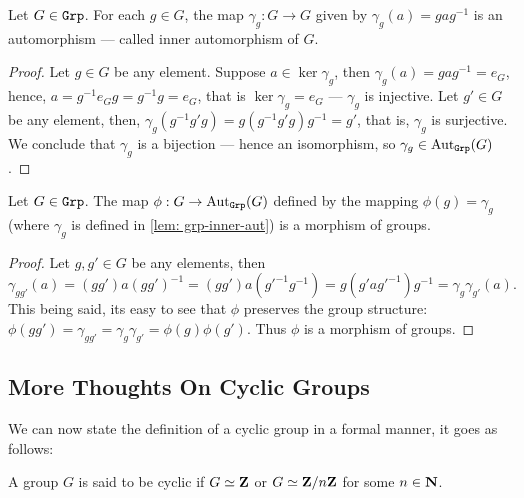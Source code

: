 \begin{lemma}\label{lem: grp-inner-aut}
    Let \(G \in {\texttt{Grp}}\). For each \(g \in G\), the map \(\gamma_g: G \to G\) given
    by \(\gamma_g(a) = gag^{-1}\) is an automorphism --- called inner
    automorphism of \(G\).
\end{lemma}

\begin{proof}
    Let \(g \in G\) be any element. Suppose \(a \in \ker\gamma_g\), then
    \(\gamma_g(a) = gag^{-1} = e_G\), hence, \(a = g^{-1} e_G g = g^{-1}g = e_G\),
    that is \(\ker\gamma_g = e_G\) --- \(\gamma_g\) is injective. Let \(g' \in G\)
    be any element, then, \(\gamma_g(g^{-1} g' g) = g (g^{-1} g' g) g^{-1} = g'\),
    that is, \(\gamma_g\) is surjective. We conclude that \(\gamma_g\) is a
    bijection --- hence an isomorphism, so \(\gamma_g \in \operatorname{Aut}_{\texttt{Grp}}(G)\).
\end{proof}

\begin{lemma}\label{lem: grp-inner-aut-cor}
    Let \(G \in {\texttt{Grp}}\). The map \(\phi: G \to \operatorname{Aut}_{\texttt{Grp}}(G)\) defined by the
    mapping \(\phi(g) = \gamma_g\) (where \(\gamma_g\) is defined in \cref{lem:
        grp-inner-aut}) is a morphism of groups.
\end{lemma}

\begin{proof}
    Let \(g, g' \in G\) be any elements, then
    \[
        \gamma_{gg'}(a) = (gg')a{(gg')}^{-1} = (g g') a (g'^{-1} g^{-1})
        = g(g' a g'^{-1}) g^{-1} = \gamma_g \gamma_{g'}(a).
    \]
    This being said, its easy to see that \(\phi\) preserves the group structure:
    \(\phi(gg') = \gamma_{gg'} = \gamma_g \gamma_{g'} = \phi(g) \phi(g')\). Thus
    \(\phi\) is a morphism of groups.
\end{proof}


\subsection{More Thoughts On Cyclic Groups}

We can now state the definition of a cyclic group in a formal manner, it goes as
follows:

\begin{definition}\label{def: cyclic-grp}
    A group \(G\) is said to be cyclic if \(G \simeq \mathbf{Z}\) or \(G \simeq \mathbf{Z}/n\mathbf{Z}\) for
    some \(n \in \mathbf{N}\).
\end{definition}

